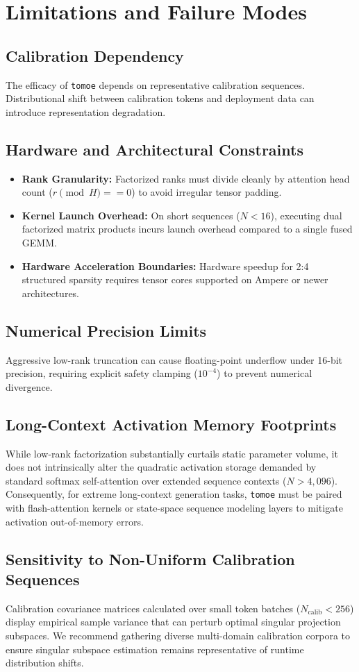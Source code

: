 \section{Limitations and Failure Modes}

\subsection{Calibration Dependency}
The efficacy of \texttt{tomoe} depends on representative calibration sequences. Distributional shift between calibration tokens and deployment data can introduce representation degradation.

\subsection{Hardware and Architectural Constraints}
\begin{itemize}
\item \textbf{Rank Granularity:} Factorized ranks must divide cleanly by attention head count ($r \pmod H == 0$) to avoid irregular tensor padding.
\item \textbf{Kernel Launch Overhead:} On short sequences ($N < 16$), executing dual factorized matrix products incurs launch overhead compared to a single fused GEMM.
\item \textbf{Hardware Acceleration Boundaries:} Hardware speedup for 2:4 structured sparsity requires tensor cores supported on Ampere or newer architectures.
\end{itemize}

\subsection{Numerical Precision Limits}
Aggressive low-rank truncation can cause floating-point underflow under 16-bit precision, requiring explicit safety clamping ($10^{-4}$) to prevent numerical divergence.

\subsection{Long-Context Activation Memory Footprints}
While low-rank factorization substantially curtails static parameter volume, it does not intrinsically alter the quadratic activation storage demanded by standard softmax self-attention over extended sequence contexts ($N > 4{,}096$). Consequently, for extreme long-context generation tasks, \texttt{tomoe} must be paired with flash-attention kernels or state-space sequence modeling layers to mitigate activation out-of-memory errors.

\subsection{Sensitivity to Non-Uniform Calibration Sequences}
Calibration covariance matrices calculated over small token batches ($N_{\text{calib}} < 256$) display empirical sample variance that can perturb optimal singular projection subspaces. We recommend gathering diverse multi-domain calibration corpora to ensure singular subspace estimation remains representative of runtime distribution shifts.
